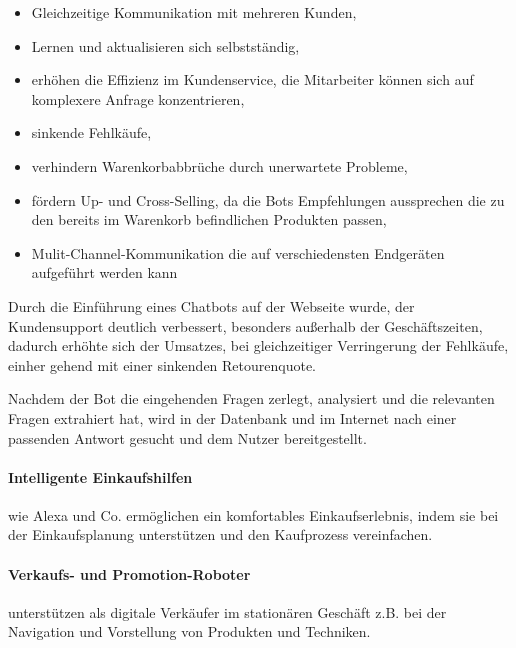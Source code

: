 \begin{itemize}
	\item Gleichzeitige Kommunikation mit mehreren Kunden,
	\item Lernen und aktualisieren sich selbstständig,
	\item erhöhen die Effizienz im Kundenservice, die Mitarbeiter können sich auf komplexere Anfrage konzentrieren,
	\item sinkende Fehlkäufe,
	\item verhindern Warenkorbabbrüche durch unerwartete Probleme,
	\item fördern Up- und Cross-Selling, da die Bots Empfehlungen aussprechen die zu den bereits im Warenkorb befindlichen Produkten passen,
	\item Mulit-Channel-Kommunikation die auf verschiedensten Endgeräten aufgeführt werden kann 
\end{itemize}

Durch die Einführung eines Chatbots auf der Webseite wurde, der Kundensupport deutlich verbessert, besonders außerhalb der Geschäftszeiten, dadurch erhöhte sich der Umsatzes, bei gleichzeitiger Verringerung der Fehlkäufe, einher gehend mit einer sinkenden Retourenquote.\vspace{0.2cm}

Nachdem der Bot die eingehenden Fragen zerlegt, analysiert und die relevanten Fragen extrahiert hat, wird in der Datenbank und im Internet nach einer passenden Antwort gesucht und dem Nutzer bereitgestellt.


\paragraph{Intelligente Einkaufshilfen} wie Alexa und Co. ermöglichen ein komfortables Einkaufserlebnis, indem sie bei der Einkaufsplanung unterstützen und den Kaufprozess vereinfachen.

\paragraph{Verkaufs- und Promotion-Roboter} unterstützen als digitale Verkäufer im stationären Geschäft z.B. bei der Navigation und Vorstellung von Produkten und Techniken.